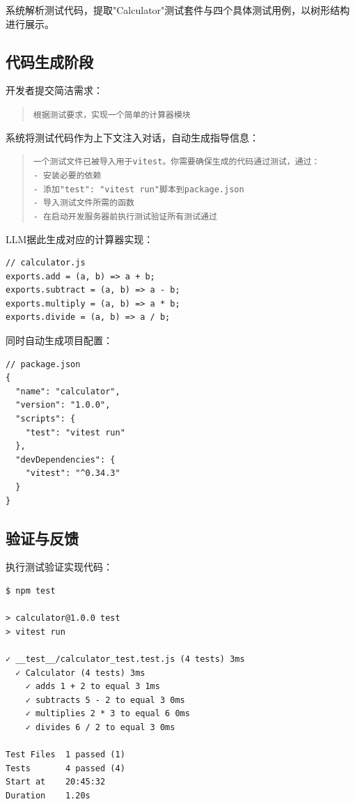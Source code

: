 系统解析测试代码，提取"Calculator"测试套件与四个具体测试用例，以树形结构进行展示。

\subsection{代码生成阶段}

开发者提交简洁需求：

\begin{quote}
\texttt{根据测试要求，实现一个简单的计算器模块}
\end{quote}

系统将测试代码作为上下文注入对话，自动生成指导信息：

\begin{quote}
\texttt{一个测试文件已被导入用于vitest。你需要确保生成的代码通过测试，通过：\\
- 安装必要的依赖\\
- 添加"test": "vitest run"脚本到package.json\\
- 导入测试文件所需的函数\\
- 在启动开发服务器前执行测试验证所有测试通过}
\end{quote}

LLM据此生成对应的计算器实现：

\begin{verbatim}
// calculator.js
exports.add = (a, b) => a + b;
exports.subtract = (a, b) => a - b;
exports.multiply = (a, b) => a * b;
exports.divide = (a, b) => a / b;
\end{verbatim}

同时自动生成项目配置：

\begin{verbatim}
// package.json
{
  "name": "calculator",
  "version": "1.0.0",
  "scripts": {
    "test": "vitest run"
  },
  "devDependencies": {
    "vitest": "^0.34.3"
  }
}
\end{verbatim}

\subsection{验证与反馈}

执行测试验证实现代码\cite{Vitest2023}：

\begin{verbatim}
$ npm test

> calculator@1.0.0 test
> vitest run

✓ __test__/calculator_test.test.js (4 tests) 3ms
  ✓ Calculator (4 tests) 3ms
    ✓ adds 1 + 2 to equal 3 1ms
    ✓ subtracts 5 - 2 to equal 3 0ms
    ✓ multiplies 2 * 3 to equal 6 0ms
    ✓ divides 6 / 2 to equal 3 0ms

Test Files  1 passed (1)
Tests       4 passed (4)
Start at    20:45:32
Duration    1.20s
\end{verbatim}

